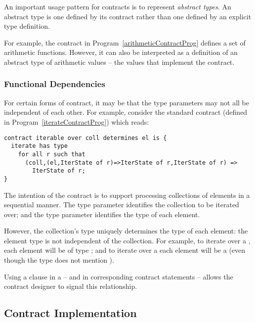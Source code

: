 \begin{aside}
An important usage pattern for contracts is to represent \emph{abstract types}. An abstract type is one defined by its contract rather than one defined by an explicit type definition.

For example, the  contract in Program~\vref{arithmeticContractProg} defines a set of arithmetic functions. However, it can also be interpreted as a definition of an abstract type of arithmetic values -- the values that implement the  contract.
\end{aside}

\subsubsection{Functional Dependencies}
\label{ContractFunctionalDependency}

For certain forms of contract, it may be that the type parameters may not all be independent of each other. For example, consider the standard  contract (defined in Program~\vref{iterateContractProg}) which reads:
\begin{lstlisting}
contract iterable over coll determines el is {
  iterate has type 
    for all r such that 
      (coll,(el,IterState of r)=>IterState of r,IterState of r) => 
        IterState of r;
}
\end{lstlisting}
The intention of the  contract is to support processing collections of elements in a sequential manner. The type parameter  identifies the collection to be iterated over; and the type parameter  identifies the type of each element.

However, the collection's type uniquely determines the type of each element: the element type is not independent of the collection. For example, to iterate over a , each element will be of type ; and to iterate over a  each element will be a  (even though the  type does not mention ).

Using a  clause in a  -- and in corresponding contract  statements -- allows the contract designer to signal this relationship.

\subsection{Contract Implementation}
\label{ContractImplementation}

